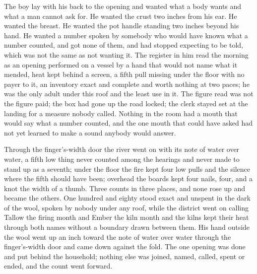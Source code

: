 The boy lay with his back to the opening and wanted what a body wants and what a man cannot ask for. He wanted the crust two inches from his ear. He wanted the breast. He wanted the pot handle standing two inches beyond his hand. He wanted a number spoken by somebody who would have known what a number counted, and got none of them, and had stopped expecting to be told, which was not the same as not wanting it. The register in him read the morning as an opening performed on a vessel by a hand that would not name what it mended, heat kept behind a screen, a fifth pull missing under the floor with no payer to it, an inventory exact and complete and worth nothing at two paces; he was the only adult under this roof and the least use in it. The figure read was not the figure paid; the box had gone up the road locked; the clerk stayed set at the landing for a measure nobody called. Nothing in the room had a mouth that would say what a number counted, and the one mouth that could have asked had not yet learned to make a sound anybody would answer.

Through the finger's-width door the river went on with its note of water over water, a fifth low thing never counted among the hearings and never made to stand up as a seventh; under the floor the fire kept four low pulls and the silence where the fifth should have been; overhead the boards kept four nails, four, and a knot the width of a thumb. Three counts in three places, and none rose up and became the others. One hundred and eighty stood exact and unspent in the dark of the wool, spoken by nobody under any roof, while the district went on calling Tallow the firing month and Ember the kiln month and the kilns kept their heat through both names without a boundary drawn between them. His hand outside the wool went up an inch toward the note of water over water through the finger's-width door and came down against the fold. The one opening was done and put behind the household; nothing else was joined, named, called, spent or ended, and the count went forward.

